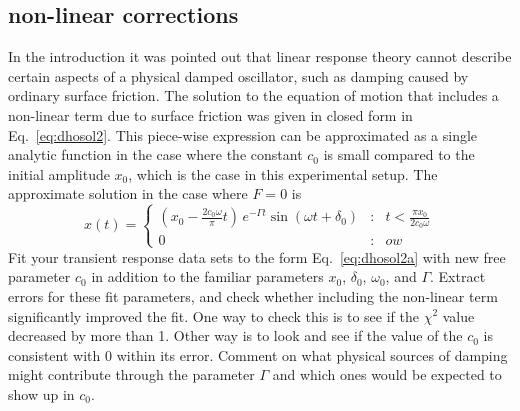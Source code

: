 \documentclass{revtex4}
\begin{document}
\subsection{non-linear corrections}

In the introduction it was pointed out that linear response theory cannot
describe certain aspects of a physical damped oscillator, such as damping
caused by ordinary surface friction.  The solution to the equation of 
motion that includes a non-linear term due to surface friction was given
in closed form in Eq.~\ref{eq:dhosol2}.  This piece-wise expression can
be approximated as a single analytic function in the case where the constant
$c_0$ is small compared to the initial amplitude $x_0$, which is the case
in this experimental setup.  The approximate solution in the case where
$F=0$ is
\begin{equation}
x(t) = \left\{\begin{array}{lll}
\left(x_0-\frac{2c_0\omega}{\pi}t\right)\,
e^{-\Gamma t}\sin(\omega t + \delta_0) &:& t<\frac{\pi x_0}{2c_0\omega} \\
0 &:& ow
\end{array} \right.
\label{eq:dhosol2a}
\end{equation}
Fit your transient response data sets to the form Eq.~\ref{eq:dhosol2a}
with new free parameter $c_0$ in addition to the familiar parameters
$x_0$, $\delta_0$, $\omega_0$, and $\Gamma$.  Extract errors for these
fit parameters, and check whether including the non-linear term significantly
improved the fit.  One way to check this is to see if the $\chi^2$ value
decreased by more than 1.  Other way is to look and see if the value of
the $c_0$ is consistent with 0 within its error.  Comment on what physical
sources of damping might contribute through the parameter $\Gamma$ and
which ones would be expected to show up in $c_0$.

\end{document}
